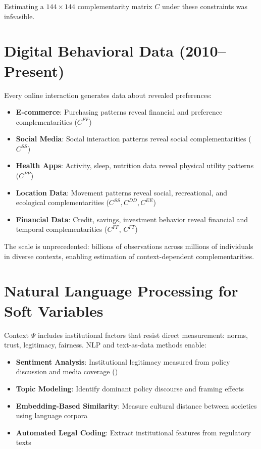 \documentclass[12pt,oneside]{book}
\begin{document}
Estimating a $144 \times 144$ complementarity matrix $C$ under these constraints was infeasible.

\section{Digital Behavioral Data (2010--Present)}

Every online interaction generates data about revealed preferences:

\begin{itemize}
  \item \textbf{E-commerce}: Purchasing patterns reveal financial and preference complementarities ($C^{FF}$)
  \item \textbf{Social Media}: Social interaction patterns reveal social complementarities ($C^{SS}$)
  \item \textbf{Health Apps}: Activity, sleep, nutrition data reveal physical utility patterns ($C^{PP}$)
  \item \textbf{Location Data}: Movement patterns reveal social, recreational, and ecological
        complementarities ($C^{SS}, C^{DD}, C^{EE}$)
  \item \textbf{Financial Data}: Credit, savings, investment behavior reveal financial and temporal
        complementarities ($C^{FF}$, $C^{FT}$)
\end{itemize}

The scale is unprecedented: billions of observations across millions of individuals in diverse
contexts, enabling estimation of context-dependent complementarities.

\section{Natural Language Processing for Soft Variables}

Context $\Psi$ includes institutional factors that resist direct measurement: norms, trust,
legitimacy, fairness. NLP and text-as-data methods enable:

\begin{itemize}
  \item \textbf{Sentiment Analysis}: Institutional legitimacy measured from policy discussion and
        media coverage (\citet{gentzkow2019})
  \item \textbf{Topic Modeling}: Identify dominant policy discourse and framing effects
  \item \textbf{Embedding-Based Similarity}: Measure cultural distance between societies using
        language corpora
  \item \textbf{Automated Legal Coding}: Extract institutional features from regulatory texts
\end{itemize}
\end{document}
